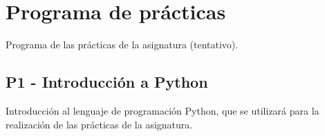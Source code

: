 \documentclass[a4paper,12pt]{article}
\begin{document}
%
%
%
%
%
%
%
\section{Programa de prácticas}

Programa de las prácticas de la asignatura (tentativo).

\subsection{P1 - Introducción a Python}

Introducción al lenguaje de programación Python, que se utilizará para la realización de las prácticas de la asignatura.
\end{document}
